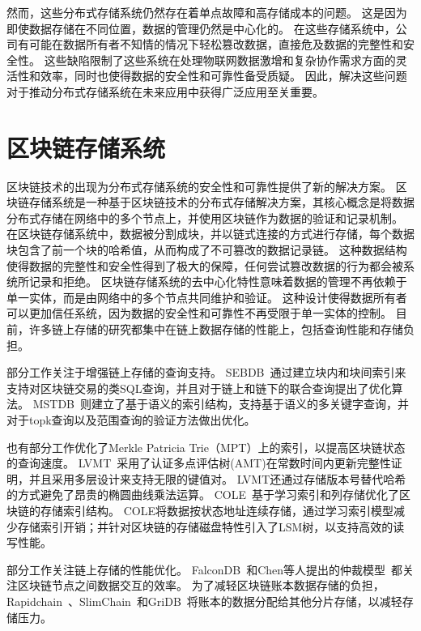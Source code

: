 然而，这些分布式存储系统仍然存在着单点故障和高存储成本的问题。
这是因为即使数据存储在不同位置，数据的管理仍然是中心化的。
在这些存储系统中，公司有可能在数据所有者不知情的情况下轻松篡改数据，直接危及数据的完整性和安全性。
这些缺陷限制了这些系统在处理物联网数据激增和复杂协作需求方面的灵活性和效率，同时也使得数据的安全性和可靠性备受质疑。
因此，解决这些问题对于推动分布式存储系统在未来应用中获得广泛应用至关重要。

\section{区块链存储系统}
区块链技术的出现为分布式存储系统的安全性和可靠性提供了新的解决方案。
区块链存储系统是一种基于区块链技术的分布式存储解决方案，其核心概念是将数据分布式存储在网络中的多个节点上，并使用区块链作为数据的验证和记录机制。
在区块链存储系统中，数据被分割成块，并以链式连接的方式进行存储，每个数据块包含了前一个块的哈希值，从而构成了不可篡改的数据记录链。
这种数据结构使得数据的完整性和安全性得到了极大的保障，任何尝试篡改数据的行为都会被系统所记录和拒绝。
区块链存储系统的去中心化特性意味着数据的管理不再依赖于单一实体，而是由网络中的多个节点共同维护和验证。
这种设计使得数据所有者可以更加信任系统，因为数据的安全性和可靠性不再受限于单一实体的控制。
目前，许多链上存储的研究都集中在链上数据存储的性能上，包括查询性能和存储负担。

部分工作关注于增强链上存储的查询支持。
SEBDB~\cite{zhu2019sebdb}通过建立块内和块间索引来支持对区块链交易的类SQL查询，并且对于链上和链下的联合查询提出了优化算法。
MSTDB~\cite{zhou2022mstdb}则建立了基于语义的索引结构，支持基于语义的多关键字查询，并对于topk查询以及范围查询的验证方法做出优化。

也有部分工作优化了Merkle Patricia Trie（MPT）上的索引，以提高区块链状态的查询速度。
LVMT~\cite{li2023lvmt}采用了认证多点评估树(AMT)在常数时间内更新完整性证明，并且采用多层设计来支持无限的键值对。
LVMT还通过存储版本号替代哈希的方式避免了昂贵的椭圆曲线乘法运算。
COLE~\cite{zhang2024cole}基于学习索引和列存储优化了区块链的存储索引结构。
COLE将数据按状态地址连续存储，通过学习索引模型减少存储索引开销；并针对区块链的存储磁盘特性引入了LSM树，以支持高效的读写性能。

部分工作关注链上存储的性能优化。
FalconDB~\cite{peng2020falcondb}和Chen等人提出的仲裁模型~\cite{chen2022blockchain}都关注区块链节点之间数据交互的效率。
为了减轻区块链账本数据存储的负担，Rapidchain~\cite{zamani2018rapidchain}、SlimChain~\cite{xu2021slimchain}和GriDB~\cite{hong2023gridb}将账本的数据分配给其他分片存储，以减轻存储压力。


